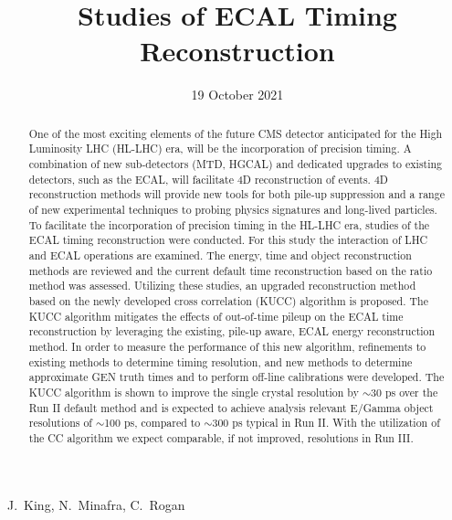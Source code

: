 \documentclass{cmspaper}
\begin{document}

\begin{titlepage}

\date{19 October 2021}

\title{Studies of ECAL Timing Reconstruction }

\begin{Authlist}
    J.~King, N.~Minafra, C.~Rogan
\end{Authlist}


\begin{abstract}
\centering
One of the most exciting elements of the future CMS detector anticipated for the High Luminosity LHC (HL-LHC) era, will be the incorporation of precision timing. A combination of new sub-detectors (MTD, HGCAL) and dedicated upgrades to existing detectors, such as the ECAL, will facilitate 4D reconstruction of events. 4D reconstruction methods will provide new tools for both pile-up suppression and a range of new experimental techniques to probing physics signatures and long-lived particles. To facilitate the incorporation of precision timing in the HL-LHC era, studies of the ECAL timing reconstruction were conducted. For this study the interaction of LHC and ECAL operations are examined. The energy, time and object reconstruction methods are reviewed and the current default time reconstruction based on the ratio method was assessed. Utilizing these studies, an upgraded reconstruction method based on the newly developed cross correlation (KUCC) algorithm is proposed. The KUCC algorithm mitigates the effects of out-of-time pileup on the ECAL time reconstruction by leveraging the existing, pile-up aware, ECAL energy reconstruction method. In order to measure the performance of this new algorithm, refinements to existing methods to determine timing resolution, and new methods to determine approximate GEN truth times and to perform off-line calibrations were developed.  The KUCC algorithm is shown to improve the single crystal resolution by $\sim$30 ps over the Run II default method and is expected to achieve analysis relevant E/Gamma object resolutions of $\sim$100 ps, compared to $\sim$300 ps typical in Run II. With the utilization of the CC algorithm we expect comparable, if not improved, resolutions in Run III.


\end{abstract}
\end{titlepage}
\end{document}

